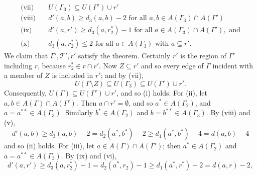 \begin{align*}
\text{(vii)} \quad & U(\Gamma_3) \subseteq U(\Gamma') \cup r' \\
\text{(viii)} \quad & d'(a, b) \ge d_3(a, b) - 2 \text{ for all } a, b \in A(\Gamma_3) \cap A(\Gamma') \\
\text{(ix)} \quad & d'(a, r') \ge d_3(a, r_2^*) - 1 \text{ for all } a \in A(\Gamma_3) \cap A(\Gamma'), \text{ and} \\
\text{(x)} \quad & d_3(a, r_2^*) \le 2 \text{ for all } a \in A(\Gamma_3) \text{ with } a \subseteq r'.
\end{align*}
We claim that $\Gamma', \mathscr{T}', r'$ satisfy the theorem. Certainly $r'$ is the region of $\Gamma'$ including $r$, because $r_2^* \in r \cap r'$. Now $Z \subseteq r'$ and so every edge of $\Gamma$ incident with a member of $Z$ is included in $r'$; and by (vii),
\begin{equation*}
U(\Gamma \setminus Z) \subseteq U(\Gamma_3) \subseteq U(\Gamma') \cup r'.
\end{equation*}
Consequently, $U(\Gamma) \subseteq U(\Gamma') \cup r'$, and so (i) holds. For (ii), let $a, b \in A(\Gamma) \cap A(\Gamma')$. Then $a \cap r' = \emptyset$, and so $a^* \in A(\Gamma_2)$, and $a = a^{**} \in A(\Gamma_3)$. Similarly $b^* \in A(\Gamma_2)$ and $b = b^{**} \in A(\Gamma_3)$. By (viii) and (v),
\begin{equation*}
d'(a, b) \ge d_3(a, b) - 2 = d_2(a^*, b^*) - 2 \ge d_1(a^*, b^*) - 4 = d(a, b) - 4
\end{equation*}
and so (ii) holds. For (iii), let $a \in A(\Gamma) \cap A(\Gamma')$; then $a^* \in A(\Gamma_2)$ and $a = a^{**} \in A(\Gamma_3)$. By (ix) and (vi),
\begin{equation*}
d'(a, r') \ge d_3(a, r_2^*) - 1 = d_2(a^*, r_2) - 1 \ge d_1(a^*, r^*) - 2 = d(a, r) - 2,
\end{equation*}
